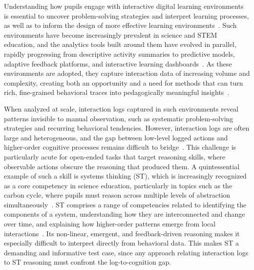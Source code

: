 \documentclass[letterpaper,journal]{IEEEtran}
\begin{document}
Understanding how pupils engage with interactive digital learning environments is essential to uncover problem-solving strategies and interpret learning processes, as well as to inform the design of more effective learning environments~\cite{wang2023applying}.
Such environments have become increasingly prevalent in science and STEM education, and the analytics tools built around them have evolved in parallel, rapidly progressing from descriptive activity summaries to predictive models, adaptive feedback platforms, and interactive learning dashboards~\cite{siemens2013learning, selwyn2020reimagining, paulsen2024learning, mohseni2024visual}.
As these environments are adopted, they capture interaction data of increasing volume and complexity, creating both an opportunity and a need for methods that can turn rich, fine-grained behavioral traces into pedagogically meaningful insights~\cite{vieira2018visual}.

When analyzed at scale, interaction logs captured in such environments reveal patterns invisible to manual observation, such as systematic problem-solving strategies and recurring behavioral tendencies.
However, interaction logs are often large and heterogeneous, and the gap between low-level logged actions and higher-order cognitive processes remains difficult to bridge~\cite{bogarin2018survey}.
This challenge is particularly acute for open-ended tasks that target reasoning skills, where observable actions obscure the reasoning that produced them.
A quintessential example of such a skill is systems thinking (ST), which is increasingly recognized as a core competency in science education, particularly in topics such as the carbon cycle, where pupils must reason across multiple levels of abstraction simultaneously~\cite{hmelor2007fish}.
ST comprises a range of competencies related to identifying the components of a system, understanding how they are interconnected and change over time, and explaining how higher-order patterns emerge from local interactions~\cite{assaraf2005development, verhoeff2018theoretical}.
Its non-linear, emergent, and feedback-driven reasoning makes it especially difficult to interpret directly from behavioral data.
This makes ST a demanding and informative test case, since any approach relating interaction logs to ST reasoning must confront the log-to-cognition gap.
\end{document}
